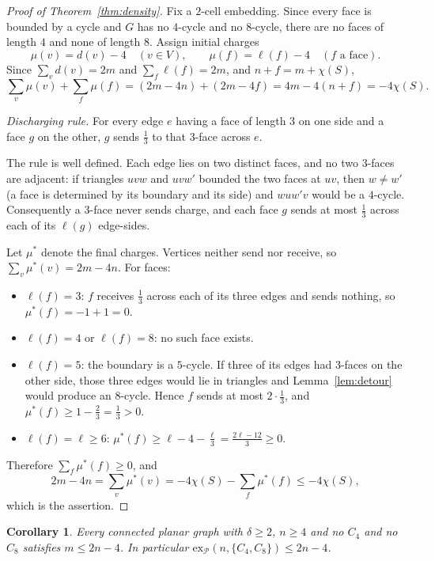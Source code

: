 \documentclass[11pt]{article}
\theoremstyle{plain}
\newtheorem{corollary}[theorem]{Corollary}
\theoremstyle{definition}
\newcommand{\Cfour}{C_4}
\newcommand{\Ceight}{C_8}
\begin{document}
\begin{proof}[Proof of Theorem~\ref{thm:density}]
Fix a $2$-cell embedding. Since every face is bounded by a cycle and $G$ has no
$4$-cycle and no $8$-cycle, there are no faces of length $4$ and none of length
$8$. Assign initial charges
\[
  \mu(v)=d(v)-4\quad(v\in V),\qquad \mu(f)=\ell(f)-4\quad(f\text{ a face}).
\]
Since $\sum_v d(v)=2m$ and $\sum_f \ell(f)=2m$, and $n+f=m+\chi(S)$,
\[
  \sum_v\mu(v)+\sum_f\mu(f)=(2m-4n)+(2m-4f)=4m-4(n+f)=-4\chi(S).
\]

\emph{Discharging rule.} For every edge $e$ having a face of length $3$ on one
side and a face $g$ on the other, $g$ sends $\tfrac13$ to that $3$-face across
$e$.

The rule is well defined. Each edge lies on two distinct faces, and no two
$3$-faces are adjacent: if triangles $uvw$ and $uvw'$ bounded the two faces at
$uv$, then $w\ne w'$ (a face is determined by its boundary and its side) and
$w u w' v$ would be a $4$-cycle. Consequently a $3$-face never sends charge, and
each face $g$ sends at most $\tfrac13$ across each of its $\ell(g)$ edge-sides.

Let $\mu^{*}$ denote the final charges. Vertices neither send nor receive, so
$\sum_v\mu^{*}(v)=2m-4n$. For faces:

\begin{itemize}
\item $\ell(f)=3$: $f$ receives $\tfrac13$ across each of its three edges and
sends nothing, so $\mu^{*}(f)=-1+1=0$.
\item $\ell(f)=4$ or $\ell(f)=8$: no such face exists.
\item $\ell(f)=5$: the boundary is a $5$-cycle. If three of its edges had
$3$-faces on the other side, those three edges would lie in triangles and
Lemma~\ref{lem:detour} would produce an $8$-cycle. Hence $f$ sends at most
$2\cdot\tfrac13$, and $\mu^{*}(f)\ge 1-\tfrac23=\tfrac13>0$.
\item $\ell(f)=\ell\ge6$: $\mu^{*}(f)\ge \ell-4-\tfrac{\ell}{3}
=\tfrac{2\ell-12}{3}\ge0$.
\end{itemize}

Therefore $\sum_f\mu^{*}(f)\ge0$, and
\[
  2m-4n=\sum_v\mu^{*}(v)=-4\chi(S)-\sum_f\mu^{*}(f)\le-4\chi(S),
\]
which is the assertion.
\end{proof}

\begin{corollary}\label{cor:planarturan}
Every connected planar graph with $\delta\ge2$, $n\ge4$ and no $\Cfour$ and no
$\Ceight$ satisfies $m\le 2n-4$. In particular
$\mathrm{ex}_{\mathcal P}(n,\{\Cfour,\Ceight\})\le 2n-4$.
\end{corollary}
\end{document}
